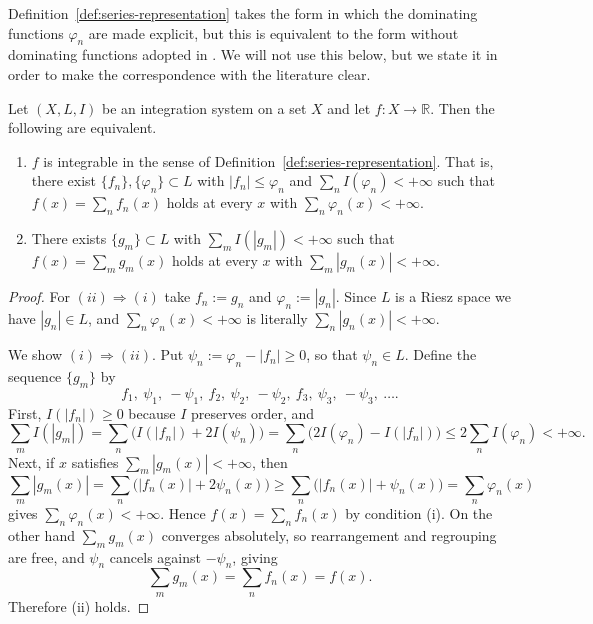 \medskip
Definition~\ref{def:series-representation} takes the form in which the
dominating functions $\varphi_n$ are made explicit, but this is equivalent to the
form without dominating functions adopted in \cite{BM}.
We will not use this below, but we state it in order to make the correspondence
with the literature clear.

\begin{lemma}\label{lem:series-rep-equiv}
  Let $(X,L,I)$ be an integration system on a set $X$ and let
  $f:X\to\mathbb{R}$.
  Then the following are equivalent.
  \begin{enumerate}
    \item[(i)] $f$ is integrable in the sense of
      Definition~\ref{def:series-representation}.
      That is, there exist $\{f_n\},\{\varphi_n\}\subset L$ with
      $|f_n|\le\varphi_n$ and $\sum_n I(\varphi_n)<+\infty$ such that
      $f(x)=\sum_n f_n(x)$ holds at every $x$ with
      $\sum_n\varphi_n(x)<+\infty$.
    \item[(ii)] There exists $\{g_m\}\subset L$ with
      $\sum_m I(|g_m|)<+\infty$ such that $f(x)=\sum_m g_m(x)$ holds at every
      $x$ with $\sum_m|g_m(x)|<+\infty$.
  \end{enumerate}
\end{lemma}
\begin{proof}
  For $(ii)\Rightarrow(i)$ take $f_n:=g_n$ and $\varphi_n:=|g_n|$.
  Since $L$ is a Riesz space we have $|g_n|\in L$, and
  $\sum_n\varphi_n(x)<+\infty$ is literally $\sum_n|g_n(x)|<+\infty$.

  We show $(i)\Rightarrow(ii)$. Put $\psi_n:=\varphi_n-|f_n|\ge0$, so that
  $\psi_n\in L$.
  Define the sequence $\{g_m\}$ by
  \[
    f_1,\ \psi_1,\ -\psi_1,\ f_2,\ \psi_2,\ -\psi_2,\ f_3,\ \psi_3,\ -\psi_3,\ \dots .
  \]
  First, $I(|f_n|)\ge0$ because $I$ preserves order, and
  \[
    \sum_m I(|g_m|)
    =\sum_n\bigl(I(|f_n|)+2I(\psi_n)\bigr)
    =\sum_n\bigl(2I(\varphi_n)-I(|f_n|)\bigr)
    \le2\sum_n I(\varphi_n)<+\infty.
  \]
  Next, if $x$ satisfies $\sum_m|g_m(x)|<+\infty$, then
  \[
    \sum_m|g_m(x)|
    =\sum_n\bigl(|f_n(x)|+2\psi_n(x)\bigr)
    \ge\sum_n\bigl(|f_n(x)|+\psi_n(x)\bigr)
    =\sum_n\varphi_n(x)
  \]
  gives $\sum_n\varphi_n(x)<+\infty$. Hence $f(x)=\sum_n f_n(x)$ by condition
  (i).
  On the other hand $\sum_m g_m(x)$ converges absolutely, so rearrangement and
  regrouping are free, and $\psi_n$ cancels against $-\psi_n$, giving
  \[
    \sum_m g_m(x)=\sum_n f_n(x)=f(x) .
  \]
  Therefore (ii) holds.
\end{proof}

